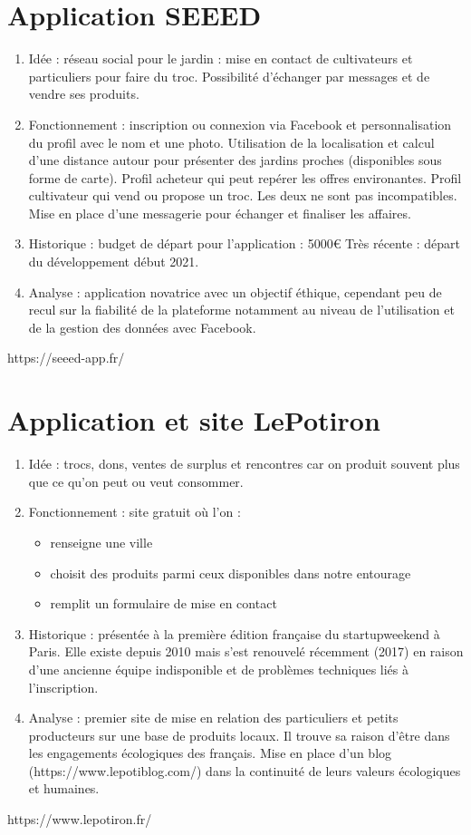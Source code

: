 \documentclass{article}
\begin{document}
\section{Application SEEED}
\begin{enumerate}
    \item Idée : réseau social pour le jardin : mise en contact de
    cultivateurs et particuliers pour faire du troc. Possibilité 
    d'échanger par messages et de vendre ses produits.
    \item Fonctionnement : inscription ou connexion via Facebook et
    personnalisation du profil avec le nom et une photo.
    Utilisation de la localisation et calcul d'une distance autour
    pour présenter des jardins proches (disponibles sous forme de carte).
    Profil acheteur qui peut repérer les offres environantes.
    Profil cultivateur qui vend ou propose un troc.
    Les deux ne sont pas incompatibles.
    Mise en place d'une messagerie pour échanger et finaliser les affaires.
    \item Historique : budget de départ pour l'application : 5000€
    Très récente : départ du développement début 2021.
    \item Analyse : application novatrice avec un objectif éthique,
    cependant peu de recul sur la fiabilité de la plateforme notamment
    au niveau de l'utilisation et de la gestion des données avec Facebook.
\end{enumerate}
https://seeed-app.fr/ 

\section{Application et site LePotiron} 
\begin{enumerate}
    \item Idée : trocs, dons, ventes de surplus et rencontres car on produit
    souvent plus que ce qu'on peut ou veut consommer.
    \item Fonctionnement : site gratuit où l'on :
    \begin{itemize}
        \item renseigne une ville
        \item choisit des produits parmi ceux disponibles dans notre entourage
        \item remplit un formulaire de mise en contact
    \end{itemize}
        \item Historique : présentée à la première édition française du startupweekend à Paris. Elle existe depuis 2010 mais s'est 
    renouvelé récemment (2017) en raison d'une ancienne équipe indisponible et de problèmes
    techniques liés à l'inscription.
    \item Analyse : premier site de mise en relation des particuliers et petits producteurs sur une base de produits locaux. Il trouve sa raison d'être dans les engagements écologiques des français.
    Mise en place d'un blog (https://www.lepotiblog.com/) dans la continuité
    de leurs valeurs écologiques et humaines.
\end{enumerate}
https://www.lepotiron.fr/
\end{document}
